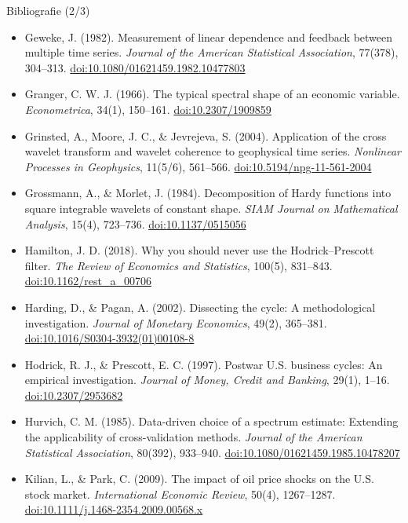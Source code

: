 \begin{frame}{Bibliografie (2/3)}
\itemsize{\tiny}
\begin{itemize}
    \item Geweke, J. (1982). Measurement of linear dependence and feedback between multiple time series. \textit{Journal of the American Statistical Association}, 77(378), 304--313. \href{https://doi.org/10.1080/01621459.1982.10477803}{doi:10.1080/01621459.1982.10477803}
    \item Granger, C. W. J. (1966). The typical spectral shape of an economic variable. \textit{Econometrica}, 34(1), 150--161. \href{https://doi.org/10.2307/1909859}{doi:10.2307/1909859}
    \item Grinsted, A., Moore, J. C., \& Jevrejeva, S. (2004). Application of the cross wavelet transform and wavelet coherence to geophysical time series. \textit{Nonlinear Processes in Geophysics}, 11(5/6), 561--566. \href{https://doi.org/10.5194/npg-11-561-2004}{doi:10.5194/npg-11-561-2004}
    \item Grossmann, A., \& Morlet, J. (1984). Decomposition of Hardy functions into square integrable wavelets of constant shape. \textit{SIAM Journal on Mathematical Analysis}, 15(4), 723--736. \href{https://doi.org/10.1137/0515056}{doi:10.1137/0515056}
    \item Hamilton, J. D. (2018). Why you should never use the Hodrick--Prescott filter. \textit{The Review of Economics and Statistics}, 100(5), 831--843. \href{https://doi.org/10.1162/rest_a_00706}{doi:10.1162/rest\_a\_00706}
    \item Harding, D., \& Pagan, A. (2002). Dissecting the cycle: A methodological investigation. \textit{Journal of Monetary Economics}, 49(2), 365--381. \href{https://doi.org/10.1016/S0304-3932(01)00108-8}{doi:10.1016/S0304-3932(01)00108-8}
    \item Hodrick, R. J., \& Prescott, E. C. (1997). Postwar U.S. business cycles: An empirical investigation. \textit{Journal of Money, Credit and Banking}, 29(1), 1--16. \href{https://doi.org/10.2307/2953682}{doi:10.2307/2953682}
    \item Hurvich, C. M. (1985). Data-driven choice of a spectrum estimate: Extending the applicability of cross-validation methods. \textit{Journal of the American Statistical Association}, 80(392), 933--940. \href{https://doi.org/10.1080/01621459.1985.10478207}{doi:10.1080/01621459.1985.10478207}
    \item Kilian, L., \& Park, C. (2009). The impact of oil price shocks on the U.S. stock market. \textit{International Economic Review}, 50(4), 1267--1287. \href{https://doi.org/10.1111/j.1468-2354.2009.00568.x}{doi:10.1111/j.1468-2354.2009.00568.x}

\end{itemize}
\end{frame}
